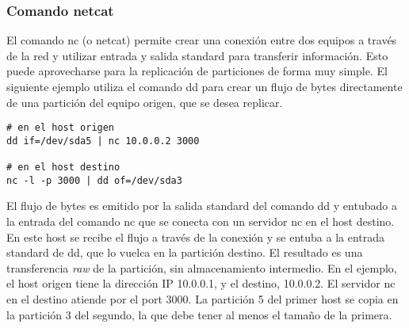 \subsubsection{Comando netcat}

El comando nc (o netcat) permite crear una conexión entre dos equipos a través de la red y utilizar entrada y salida standard para transferir información. Esto puede aprovecharse para la replicación de particiones de forma muy simple. El siguiente ejemplo utiliza el comando dd para crear un flujo de bytes directamente de una partición del equipo origen, que se desea replicar. 

\begin{lstlisting}
# en el host origen
dd if=/dev/sda5 | nc 10.0.0.2 3000

# en el host destino
nc -l -p 3000 | dd of=/dev/sda3
\end{lstlisting}

El flujo de bytes es emitido por la salida standard del comando dd y entubado a la entrada del comando nc que se conecta con un servidor nc en el host destino. En este host se recibe el flujo a través de la conexión y se entuba a la entrada standard de dd, que lo vuelca en la partición destino. El resultado es una transferencia \emph{raw} de la partición, sin almacenamiento intermedio. En el ejemplo, el host origen tiene la dirección IP 10.0.0.1, y el destino, 10.0.0.2. El servidor nc en el destino atiende por el port 3000. La partición 5 del primer host se copia en la partición 3 del segundo, la que debe tener al menos el tamaño de la primera.

